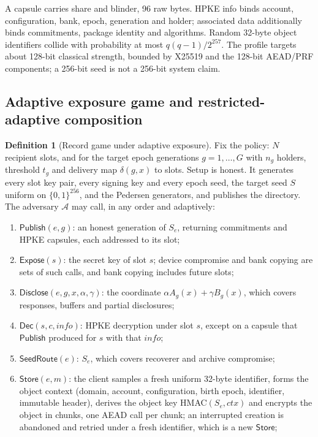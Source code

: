 \documentclass[pdflatex,sn-mathphys-num]{sn-jnl}%
\theoremstyle{plain}
\theoremstyle{definition}
\newtheorem{definition}[theorem]{Definition}
\begin{document}
A capsule carries share and blinder, 96 raw bytes. HPKE info binds account, configuration, bank, epoch, generation and holder; associated data additionally binds commitments, package identity and algorithms. Random 32-byte object identifiers collide with probability at most $q(q-1)/2^{257}$. The profile targets about 128-bit classical strength, bounded by X25519 and the 128-bit AEAD/PRF components; a 256-bit seed is not a 256-bit system claim.

\subsection{Adaptive exposure game and restricted-adaptive composition}\label{sec:adaptive}
\begin{definition}[Record game under adaptive exposure]\label{def:adaptivegame}
Fix the policy: $N$ recipient slots, and for the target epoch generations $g=1,\dots,G$ with $n_g$ holders, threshold $t_g$ and delivery map $\delta(g,x)$ to slots. Setup is honest. It generates every slot key pair, every signing key and every epoch seed, the target seed $S$ uniform on $\{0,1\}^{256}$, and the Pedersen generators, and publishes the directory. The adversary $\mathcal A$ may call, in any order and adaptively:
\begin{enumerate}
\item $\mathsf{Publish}(e,g)$: an honest generation of $S_e$, returning commitments and HPKE capsules, each addressed to its slot;
\item $\mathsf{Expose}(s)$: the secret key of slot $s$; device compromise and bank copying are sets of such calls, and bank copying includes future slots;
\item $\mathsf{Disclose}(e,g,x,\alpha,\gamma)$: the coordinate $\alpha A_g(x)+\gamma B_g(x)$, which covers responses, buffers and partial disclosures;
\item $\mathsf{Dec}(s,c,\mathit{info})$: HPKE decryption under slot $s$, except on a capsule that $\mathsf{Publish}$ produced for $s$ with that $\mathit{info}$;
\item $\mathsf{SeedRoute}(e)$: $S_e$, which covers recoverer and archive compromise;
\item $\mathsf{Store}(e,m)$: the client samples a fresh uniform 32-byte identifier, forms the object context (domain, account, configuration, birth epoch, identifier, immutable header), derives the object key HMAC$(S_e,\mathit{ctx})$ and encrypts the object in chunks, one AEAD call per chunk; an interrupted creation is abandoned and retried under a fresh identifier, which is a new $\mathsf{Store}$;

\end{enumerate}
\end{definition}
\end{document}
